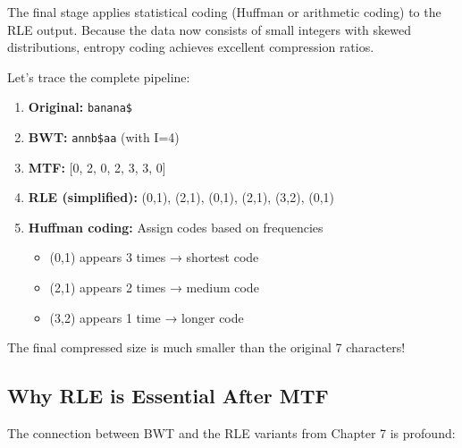 The final stage applies statistical coding (Huffman or arithmetic coding) to the RLE output. Because the data now consists of small integers with skewed distributions, entropy coding achieves excellent compression ratios.

\begin{examplebox}

Let's trace the complete pipeline:

\begin{enumerate}
    \item \textbf{Original:} \texttt{banana\$}
    
    \item \textbf{BWT:} \texttt{annb\$aa} (with I=4)
    
    \item \textbf{MTF:} [0, 2, 0, 2, 3, 3, 0]
    
    \item \textbf{RLE (simplified):} (0,1), (2,1), (0,1), (2,1), (3,2), (0,1)
    
    \item \textbf{Huffman coding:} Assign codes based on frequencies
    \begin{itemize}
        \item (0,1) appears 3 times → shortest code
        \item (2,1) appears 2 times → medium code
        \item (3,2) appears 1 time → longer code
    \end{itemize}
\end{enumerate}

The final compressed size is much smaller than the original 7 characters!
\end{examplebox}

\subsection{Why RLE is Essential After MTF}

The connection between BWT and the RLE variants from Chapter 7 is profound:


